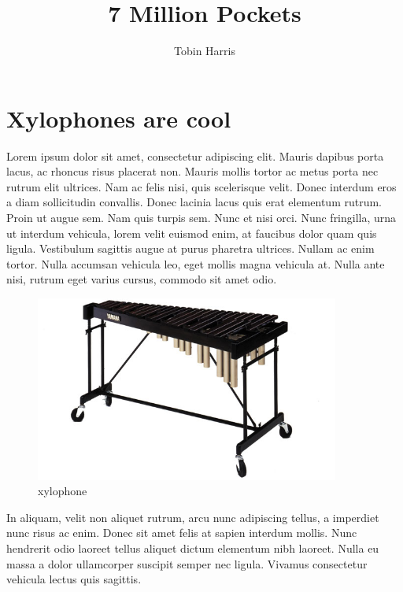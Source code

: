 \documentclass[11pt,oneside,openany]{book}
\begin{document}
\frontmatter
\title{7 Million Pockets}
\author{Tobin Harris}
\maketitle
\tableofcontents

\mainmatter
\chapter{Xylophones are cool}\hypertarget{xylophones-are-cool}{}\label{xylophones-are-cool}

Lorem ipsum dolor sit amet, consectetur adipiscing elit. Mauris dapibus porta lacus, ac rhoncus risus placerat non. Mauris mollis tortor ac metus porta nec rutrum elit ultrices. Nam ac felis nisi, quis scelerisque velit. Donec interdum eros a diam sollicitudin convallis. Donec lacinia lacus quis erat elementum rutrum. Proin ut augue sem. Nam quis turpis sem. Nunc et nisi orci. Nunc fringilla, urna ut interdum vehicula, lorem velit euismod enim, at faucibus dolor quam quis ligula. Vestibulum sagittis augue at purus pharetra ultrices. Nullam ac enim tortor. Nulla accumsan vehicula leo, eget mollis magna vehicula at. Nulla ante nisi, rutrum eget varius cursus, commodo sit amet odio.

\begin{figure}
\begin{center}
\includegraphics[width=100mm]{output/pdf/_media/xylophone1.jpg}
\end{center}
\caption{xylophone}

\end{figure}

In aliquam, velit non aliquet rutrum, arcu nunc adipiscing tellus, a imperdiet nunc risus ac enim. Donec sit amet felis at sapien interdum mollis. Nunc hendrerit odio laoreet tellus aliquet dictum elementum nibh laoreet. Nulla eu massa a dolor ullamcorper suscipit semper nec ligula. Vivamus consectetur vehicula lectus quis sagittis.
\end{document}
